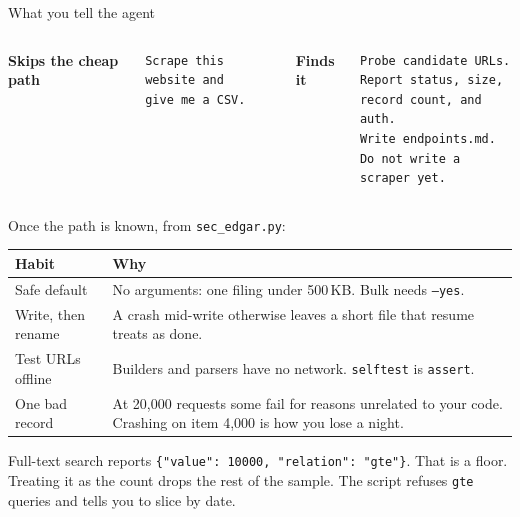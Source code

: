 \documentclass[aspectratio=1610, xcolor={dvipsnames}]{beamer}
\begin{document}
\begin{frame}[fragile]{What you tell the agent}

    \vspace{0.05cm}
    \begin{columns}[T,onlytextwidth]
        {\footnotesize\color{ccwarm}\bfseries Skips the cheap path}
        \begin{lstlisting}[style=shell]
Scrape this website and
give me a CSV.
    \end{lstlisting}

        {\footnotesize\color{bhblue}\bfseries Finds it}
        \begin{lstlisting}[style=shell]
Probe candidate URLs.
Report status, size,
record count, and auth.
Write endpoints.md.
Do not write a scraper yet.
    \end{lstlisting}
    \end{columns}

    \vspace{0.22cm}
    Once the path is known, from \texttt{sec\_edgar.py}:

    \vspace{0.08cm}
    \renewcommand{\arraystretch}{1.15}
    \footnotesize
    \begin{tabular}{@{}p{} p{}@{}}
        \toprule
        {\color{bhblue}\bfseries Habit} & {\color{bhblue}\bfseries Why}                                               \\
        \midrule
        Safe default
                                        & No arguments: one filing under 500\,KB. Bulk needs \texttt{--yes}.          \\
        Write, then rename
                                        & A crash mid-write otherwise leaves a short file that resume treats as done. \\
        Test URLs offline
                                        & Builders and parsers have no network. \texttt{selftest} is \texttt{assert}. \\
        One bad record
                                        & At 20{,}000 requests some fail for reasons unrelated to your code.
        Crashing on item 4{,}000 is how you lose a night.                                                             \\
        \bottomrule
    \end{tabular}

    \vspace{0.2cm}
    \footnotesize
    Full-text search reports \texttt{\{"value": 10000, "relation": "gte"\}}.
    That is a floor. Treating it as the count drops the rest of the sample.
    The script refuses \texttt{gte} queries and tells you to slice by date.

\end{frame}
\end{document}
